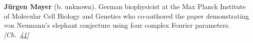 \textbf{Jürgen Mayer} (b. unknown). German biophysicist at the Max Planck Institute of Molecular Cell Biology and Genetics who co-authored the paper demonstrating von Neumann's elephant conjecture using four complex Fourier parameters. \emph{[Ch.~\hyperref[ch:hough]{41}]}

